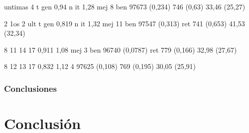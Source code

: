 \documentclass{article}
\begin{document}
untimas 4
t gen 0,94
n it 1,28
mej 8
ben 97673 (0,234)
746 (0,63)
33,46 (25,27)

2 1os 2 ult
t gen 0,819
n it 1,32
mej 11
ben 97547 (0,313)
ret 741 (0,653)
41,53 (32,34)

8 11 14 17
0,911
1,08
mej 3
ben 96740 (0,0787)
ret 779 (0,166)
32,98 (27,67)

8 12 13 17
0,832
1,12
4
97625 (0,108)
769 (0,195)
30,05 (25,91)

\subsubsection{Conclusiones}

\section*{Conclusión}
\end{document}

